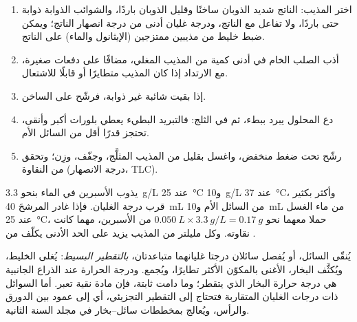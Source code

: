 \begin{method}\label{met:b1:lab-techniques-1:recrystallise}
\begin{enumerate}
  \item اختر المذيب: الناتج شديد الذوبان ساخنًا وقليل
        الذوبان باردًا، والشوائب الذوابة ذوابة حتى باردًا، ولا
        تفاعل مع الناتج، ودرجة غليان أدنى من درجة انصهار
        الناتج؛ ويمكن ضبط خليط من مذيبين ممتزجين (الإيثانول
        والماء) على الناتج.
  \item أذب الصلب الخام في أدنى كمية من المذيب المغلي، مضافًا
        على دفعات صغيرة، مع الارتداد إذا كان المذيب متطايرًا أو
        قابلًا للاشتعال.
  \item إذا بقيت شائبة غير ذوابة، فرشّح على الساخن.
  \item دع المحلول يبرد ببطء، ثم في الثلج: فالتبريد البطيء يعطي
        بلورات أكبر وأنقى، تحتجز قدرًا أقل من السائل الأم.
  \item رشّح تحت ضغط منخفض، واغسل بقليل من المذيب
        المثلَّج، وجفّف، وزِن؛ وتحقق من النقاوة (درجة الانصهار، TLC).
\end{enumerate}
\end{method}

\begin{example}
يذوب الأسبرين في الماء بنحو \qty{3.3}{g/L} عند \qty{25}{\celsius}
و\qty{10}{g/L} عند \qty{37}{\celsius}، وأكثر بكثير قرب درجة
الغليان. فإذا غادر المرشحَ \qty{40}{mL} من السائل الأم و\qty{10}{mL} من ماء الغسل
عند \qty{25}{\celsius}، حملا معهما نحو
$\qty{0.050}{L} \times \qty{3.3}{g/L} = \qty{0.17}{g}$ من الأسبرين، مهما كانت
نقاوته. وكل مليلتر من المذيب يزيد على الحد الأدنى يكلّف من .
\end{example}

يُنقّى السائل، أو يُفصل سائلان درجتا غليانهما متباعدتان،
\emph{بالتقطير البسيط}: يُغلى الخليط، ويُكثَّف البخار، الأغنى
بالمكوّن الأكثر تطايرًا، ويُجمع. ودرجة الحرارة عند الذراع
الجانبية هي درجة حرارة البخار الذي يتقطر؛ وما دامت ثابتة، فإن مادة نقية
تعبر. أما السوائل ذات درجات الغليان المتقاربة فتحتاج إلى التقطير التجزيئي، أي إلى عمود
بين الدورق والرأس، ويُعالج بمخططات سائل--بخار
في مجلد السنة الثانية.

